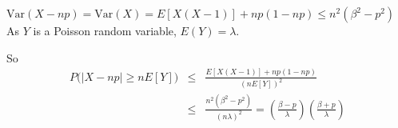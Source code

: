 \documentclass[12pt,thmsa]{article}\usepackage[]{graphicx}\usepackage[]{color}
\begin{document}
\begin{enumerate}
\begin{itemize}
$\text{Var}(X-np)=\text{Var}(X)= E[X(X-1)]+np(1-np) \leq n^2(\beta^2 -p^2)$\\

As $Y$ is a Poisson random variable, $E(Y)=\lambda$.

So
 \begin{eqnarray*}
  P\Big( \vert X-np \vert \geq nE[Y] \Big)  &\leq&  \frac{E[X(X-1)]+np(1-np)}{(nE[Y])^2}\\
&\leq&   \frac{ n^2(\beta^2 -p^2)}{(n\lambda)^2}= \left(\frac{\beta -p }{\lambda}\right) \left(\frac{\beta + p}{\lambda} \right)
 \end{eqnarray*}

\end{itemize}
\end{enumerate}
\end{document}
